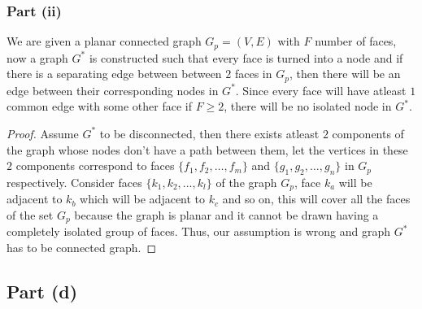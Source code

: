 \documentclass{article}
\begin{document}
{{    \subsubsection{Part (ii)}{
      We are given a planar connected graph $G_p=(V,E)$ with $F$ number of faces, now a graph $G^*$ is constructed such that every face is turned into a node and if there is a separating edge between between $2$ faces in $G_p$, then there will be an edge between their corresponding nodes in $G^*$. \newline
      Since every face will have atleast $1$ common edge with some other face if $F \geq 2$, there will be no isolated node in $G^*$.
      \begin{proof}
      Assume $G^*$ to be disconnected, then there exists atleast $2$ components of the graph whose nodes don't have a path between them, let the vertices in these $2$ components correspond to faces $\{f_1,f_2,\dots,f_m\}$ and $\{g_1,g_2,\dots,g_n\}$ in $G_p$ respectively. \newline
      Consider faces $\{k_1,k_2,\dots,k_l\}$ of the graph $G_p$, face $k_a$ will be adjacent to $k_b$ which will be adjacent to $k_c$ and so on, this will cover all the faces of the set $G_p$ because the graph is planar and it cannot be drawn having a completely isolated group of faces. \newline 
      Thus, our assumption is wrong and graph $G^*$ has to be connected graph.
    \end{proof}
    }
  }
  \subsection{Part (d)}{
}}
\end{document}
